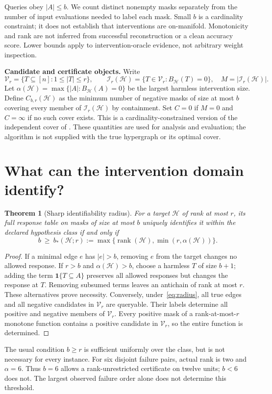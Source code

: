 \documentclass[10pt]{article}
\newtheorem{theorem}{Theorem}
\theoremstyle{definition}\newtheorem{definition}[theorem]{Definition}
\newcommand{\HH}{\mathcal H}
\newcommand{\VV}{\mathcal V}
\newcommand{\II}{\mathcal I}
\newcommand{\ind}{\mathbf 1}
\newcommand{\rank}{\operatorname{rank}}
\begin{document}
Queries obey $|A|\le b$. We count distinct nonempty masks separately from the number
of input evaluations needed to label each mask. Small $b$ is a cardinality constraint;
it does not establish that interventions are on-manifold. Monotonicity and rank are
not inferred from successful reconstruction or a clean accuracy score. Lower bounds
apply to intervention-oracle evidence, not arbitrary weight inspection.

\textbf{Candidate and certificate objects.} Write
\begin{equation}
 \VV_r=\{T\subseteq[n]:1\le |T|\le r\},\qquad
 \II_r(\HH)=\{T\in\VV_r:B_{\HH}(T)=0\},\quad M=|\II_r(\HH)|.
\end{equation}
Let $\alpha(\HH)=\max\{|A|:B_{\HH}(A)=0\}$ be the largest harmless intervention size.
Define $C_{b,r}(\HH)$ as the minimum number of negative masks of size at most $b$
covering every member of $\II_r(\HH)$ by containment. Set $C=0$ if $M=0$ and $C=\infty$
if no such cover exists. This is a cardinality-constrained version of the independent
cover of \citet{angluin2006}. These quantities are used for analysis and evaluation;
the algorithm is not supplied with the true hypergraph or its optimal cover.

\section{What can the intervention domain identify?}
\begin{theorem}[Sharp identifiability radius]\label{thm:radius}
For a target $\HH$ of rank at most $r$, its full response table on masks of size at
most $b$ uniquely identifies it within the declared hypothesis class if and only if
\begin{equation}
 b\ \ge\ b_*(\HH;r):=\max\{\rank(\HH),\min(r,\alpha(\HH))\}.
 \label{eq:radius}
\end{equation}
\end{theorem}
\begin{proof}
If a minimal edge $e$ has $|e|>b$, removing $e$ from the target changes no allowed
response. If $r>b$ and $\alpha(\HH)>b$, choose a harmless $T$ of size $b+1$; adding
the term $\ind\{T\subseteq A\}$ preserves all allowed responses but changes the
response at $T$. Removing subsumed terms leaves an antichain of rank at most $r$.
These alternatives prove necessity.
Conversely, under~\eqref{eq:radius}, all true edges and all negative candidates in
$\VV_r$ are queryable. Their labels determine all positive and negative members of
$\VV_r$. Every positive mask of a rank-at-most-$r$ monotone function contains a
positive candidate in $\VV_r$, so the entire function is determined.
\end{proof}
The usual condition $b\ge r$ is sufficient uniformly over the class, but is not
necessary for every instance. For six disjoint failure pairs, actual rank is two
and $\alpha=6$. Thus $b=6$ allows a rank-unrestricted certificate on twelve units;
$b<6$ does not. The largest observed failure order alone does not determine this
threshold.
\end{document}
